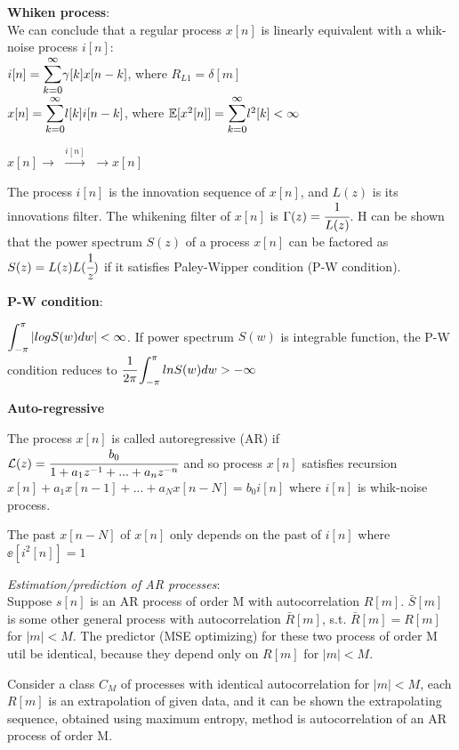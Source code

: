 \documentclass[12pt,a4paper]{article}
\begin{document}
\vspace{0.5cm}
\textbf{Whiken process}:\\
We can conclude that a regular process $x[n]$ is linearly equivalent with a whik-noise process $i[n]$:\\
$i[n]=\bsum{k=0}{\infty}\gamma[k]x[n-k]$, where $R_{L1}=\delta[m]$\\
$x[n]=\bsum{k=0}{\infty}l[k]i[n-k]$, where $\ee[x^2[n]]=\bsum{k=0}{\infty}l^2[k]<\infty$

$x[n] \longrightarrow $ $\overset{i[n]}{\longrightarrow}$  $\longrightarrow x[n]$

The process $i[n]$ is the innovation sequence of $x[n]$, and $L(z)$ is its innovations filter. 
The whikening filter of $x[n]$ is $\Gamma(z)=\cfrac{1}{L(z)}$. H can be shown that the power spectrum $S(z)$ of a process $x[n]$ can be factored as $S(z)=L(z)L(\cfrac{1}{z})$ if it satisfies Paley-Wipper condition (P-W condition).

\vspace{0.5cm}
\textbf{P-W condition}:

$\bint{-\pi}{\pi}|logS(w)dw|< \infty$. If power spectrum $S(w)$ is integrable function, the P-W condition reduces to $\cfrac{1}{2\pi}\bint{-\pi}{\pi} lnS(w)dw>-\infty$

\vspace{0.5cm}
\textbf{Auto-regressive}

The process $x[n]$ is called autoregressive (AR) if $\mathcal{L}(z)=\cfrac{b_0}{1+a_1z^{-1}+...+a_nz^{-n}}$ and so process $x[n]$ satisfies recursion \\
$x[n]+a_1x[n-1]+...+a_Nx[n-N]=b_0i[n]$ where $i[n]$ is whik-noise process. 

The past $x[n-N]$ of $x[n]$ only depends on the past of $i[n]$ where $\ee[i^2[n]]=1$

\textit{Estimation/prediction of AR processes}: \\
Suppose $s[n]$ is an AR process of order M with autocorrelation $R[m]$. $\bar{S}[m]$ is some other general process with autocorrelation $\bar{R}[m]$, s.t. $\bar{R}[m]=R[m]$ for $|m|<M$. 
The predictor (MSE optimizing) for these two process of order M util be identical, because they depend only on $R[m]$ for $|m|<M$.

Consider a class $C_M$ of processes with identical autocorrelation for $|m|<M$, each $R[m]$ is an extrapolation of given data, and it can be shown the extrapolating sequence, obtained using maximum entropy, method is autocorrelation of an AR process of order M. 
\end{document}
